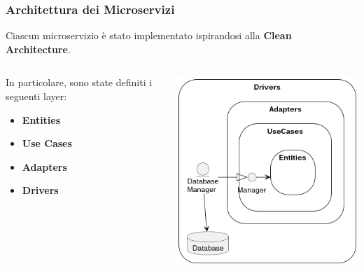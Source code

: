 \begin{frame}
    \frametitle{Architettura dei Microservizi}
    Ciascun microservizio è stato implementato ispirandosi alla \textbf{Clean Architecture}.

    \smallskip

    \begin{columns}
        \begin{column}{0.6\textwidth}
            In particolare, sono state definiti i seguenti layer:
            \begin{itemize}
                \item \textbf{Entities}
                \item \textbf{Use Cases}
                \item \textbf{Adapters}
                \item \textbf{Drivers}
            \end{itemize}
        \end{column}
        \begin{column}{0.4\textwidth}
            \begin{center}
                \includegraphics[width=\textwidth]{../img/clean}
            \end{center}
        \end{column}
    \end{columns}


\end{frame}
